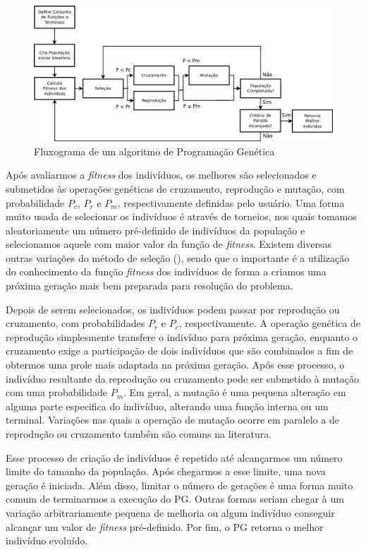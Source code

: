 \begin{figure}[t]
\centering
\includegraphics[width=1.1\textwidth]{figures/gpwf_new.png}
\caption{Fluxograma de um algoritmo de Programação Genética}
\label{fig::gpwf}
\end{figure}

Após avaliarmos a \textit{fitness} dos indivíduos, os melhores são selecionados e submetidos às operações genéticas de cruzamento, reprodução e mutação, com probabilidade $P_c$, $P_r$ e $P_m$, respectivamente definidas pelo usuário.
Uma forma muito usada de selecionar os indivíduos é através de torneios, nos quais tomamos aleatoriamente um número pré-definido de indivíduos da população e selecionamos aquele com maior valor da função de \textit{fitness}. Existem diversas outras variações do método de seleção (\cite{Koza92}), sendo que o importante é a utilização do conhecimento da função \textit{fitness} dos indivíduos de forma a criamos uma próxima geração mais bem preparada para resolução do problema. 

Depois de serem selecionados, os indivíduos podem passar por reprodução ou cruzamento, com probabilidades $P_r$ e $P_c$, respectivamente. 
A operação genética de reprodução simplesmente transfere o indivíduo para próxima geração, enquanto o cruzamento exige a participação de dois indivíduos que são combinados a fim de obtermos
uma prole mais adaptada na próxima geração.
Após esse processo, o indivíduo resultante da reprodução ou cruzamento pode ser submetido à mutação com uma probabilidade $P_m$.
Em geral, a mutação é uma pequena alteração em alguma parte especifica do indivíduo, alterando uma função interna ou um terminal.
Variações nas quais a operação de mutação ocorre em paralelo a de reprodução ou cruzamento também são comuns na literatura.

Esse processo de criação de indivíduos é repetido até alcançarmos um número limite do tamanho da população. Após chegarmos a esse limite, uma nova geração é iniciada. Além disso, limitar o número de gerações é uma forma muito comum de terminarmos a execução do \textsc{PG}. Outras formas seriam chegar à um variação arbitrariamente pequena de melhoria ou algum indivíduo conseguir alcançar um valor de \textit{fitness} pré-definido. Por fim, o \textsc{PG} retorna o melhor indivíduo evoluído.

